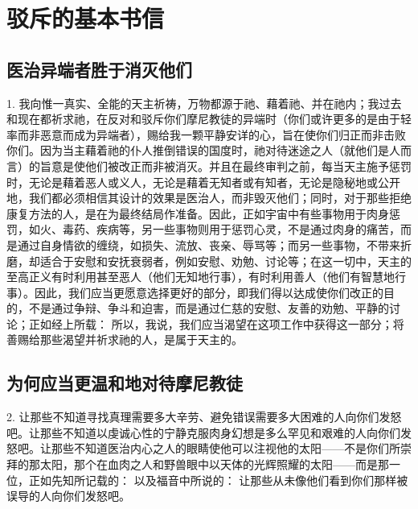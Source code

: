 
\chapter{驳斥的基本书信}



\section{医治异端者胜于消灭他们}

1. 我向惟一真实、全能的天主祈祷，万物都源于祂、藉着祂、并在祂内；我过去和现在都祈求祂，在反对和驳斥你们摩尼教徒的异端时（你们或许更多的是由于轻率而非恶意而成为异端者），赐给我一颗平静安详的心，旨在使你们归正而非击败你们。因为当主藉着祂的仆人推倒错误的国度时，祂对待迷途之人（就他们是人而言）的旨意是使他们被改正而非被消灭。并且在最终审判之前，每当天主施予惩罚时，无论是藉着恶人或义人，无论是藉着无知者或有知者，无论是隐秘地或公开地，我们都必须相信其设计的效果是医治人，而非毁灭他们；同时，对于那些拒绝康复方法的人，是在为最终结局作准备。因此，正如宇宙中有些事物用于肉身惩罚，如火、毒药、疾病等，另一些事物则用于惩罚心灵，不是通过肉身的痛苦，而是通过自身情欲的缠绕，如损失、流放、丧亲、辱骂等；而另一些事物，不带来折磨，却适合于安慰和安抚衰弱者，例如安慰、劝勉、讨论等；在这一切中，天主的至高正义有时利用甚至恶人（他们无知地行事），有时利用善人（他们有智慧地行事）。因此，我们应当更愿意选择更好的部分，即我们得以达成使你们改正的目的，不是通过争辩、争斗和迫害，而是通过仁慈的安慰、友善的劝勉、平静的讨论；正如经上所载： 所以，我说，我们应当渴望在这项工作中获得这一部分；将善赐给那些渴望并祈求祂的人，是属于天主的。\par


\section{为何应当更温和地对待摩尼教徒}

2. 让那些不知道寻找真理需要多大辛劳、避免错误需要多大困难的人向你们发怒吧。让那些不知道以虔诚心性的宁静克服肉身幻想是多么罕见和艰难的人向你们发怒吧。让那些不知道医治内心之人的眼睛使他可以注视他的太阳——不是你们所崇拜的那太阳，那个在血肉之人和野兽眼中以天体的光辉照耀的太阳——而是那一位，正如先知所记载的： 以及福音中所说的： 让那些从未像他们看到你们那样被误导的人向你们发怒吧。\par

